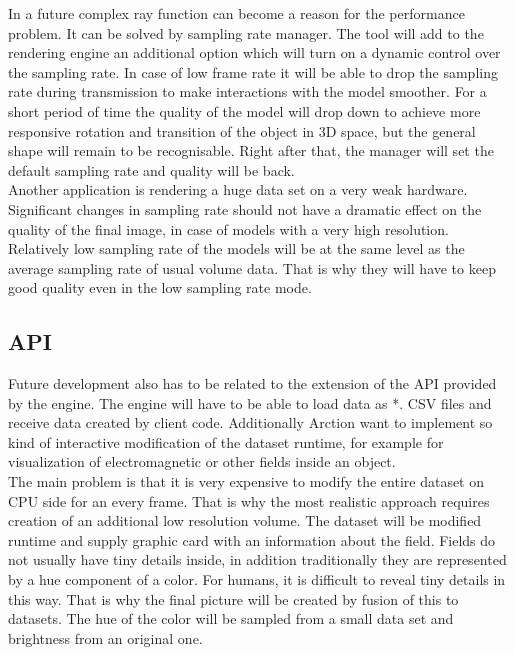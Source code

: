 \documentclass[twoside, english, 11pt]{report}
\begin{document}
In a future complex ray function can become a reason for the performance problem. It can be solved by sampling rate manager. The tool will add to the rendering engine an additional option which will turn on a dynamic control over the sampling rate. In case of low frame rate it will be able to drop the sampling rate during transmission to make interactions with the model smoother. For a short period of time the quality of the model will drop down to achieve more responsive rotation and transition of the object in 3D space, but the general shape will remain to be recognisable. Right after that, the manager will set the default sampling rate and quality will be back.\\

Another application is rendering a huge data set on a very weak hardware. Significant changes in sampling rate should not have a dramatic effect on the quality of the final image, in case of models with a very high resolution. Relatively low sampling rate of the models will be at the same level as the average sampling rate of usual volume data. That is why they will have to keep good quality even in the low sampling rate mode.


\subsection{API}

Future development also has to be related to the extension of the API provided by the engine. The engine will have to be able to load data as *. CSV files and receive data created by client code. Additionally Arction want to implement so kind of interactive modification of the dataset runtime, for example for visualization of electromagnetic or other fields inside an object. \\

The main problem is that it is very expensive to modify the entire dataset on CPU side for an every frame. That is why the most realistic approach requires creation of an additional low resolution volume. The dataset will be modified runtime and supply graphic card with an information about the field. Fields do not usually have tiny details inside, in addition traditionally they are represented by a hue component of a color. For humans, it is difficult to reveal tiny details in this way. That is why the final picture will be created by fusion of this to datasets. The hue of the color will be sampled from a small data set and brightness from an original one.
\end{document}
